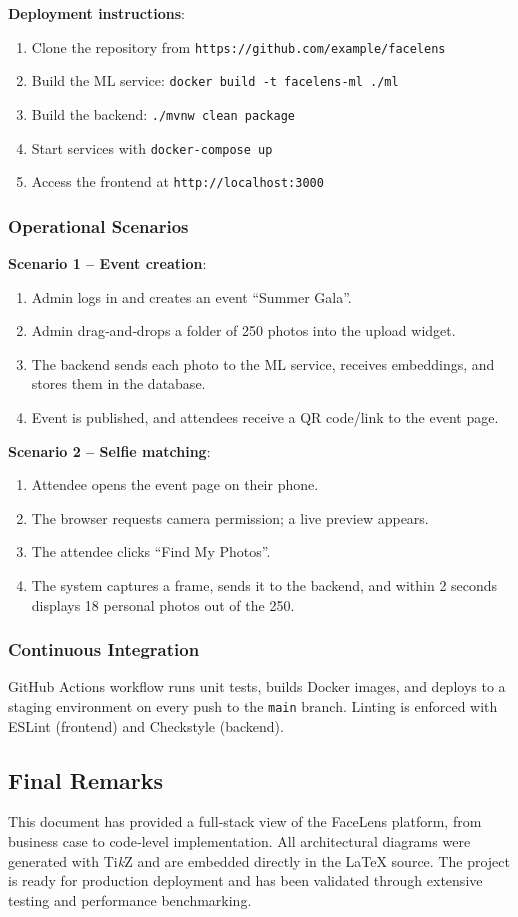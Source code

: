 \documentclass[12pt,a4paper]{article}
\begin{document}
\textbf{Deployment instructions}:
\begin{enumerate}
    \item Clone the repository from \texttt{https://github.com/example/facelens}
    \item Build the ML service: \texttt{docker build -t facelens-ml ./ml}
    \item Build the backend: \texttt{./mvnw clean package}
    \item Start services with \texttt{docker-compose up}
    \item Access the frontend at \texttt{http://localhost:3000}
\end{enumerate}

\subsubsection{Operational Scenarios}
\textbf{Scenario 1 – Event creation}:
\begin{enumerate}
    \item Admin logs in and creates an event “Summer Gala”.
    \item Admin drag‑and‑drops a folder of 250 photos into the upload widget.
    \item The backend sends each photo to the ML service, receives embeddings, and stores them in the database.
    \item Event is published, and attendees receive a QR code/link to the event page.
\end{enumerate}
\textbf{Scenario 2 – Selfie matching}:
\begin{enumerate}
    \item Attendee opens the event page on their phone.
    \item The browser requests camera permission; a live preview appears.
    \item The attendee clicks “Find My Photos”.
    \item The system captures a frame, sends it to the backend, and within 2 seconds displays 18 personal photos out of the 250.
\end{enumerate}

\subsubsection{Continuous Integration}
GitHub Actions workflow runs unit tests, builds Docker images, and deploys to a staging environment on every push to the \texttt{main} branch. Linting is enforced with ESLint (frontend) and Checkstyle (backend).

\subsection{Final Remarks}
This document has provided a full‑stack view of the FaceLens platform, from business case to code‑level implementation. All architectural diagrams were generated with Ti\textit{k}Z and are embedded directly in the \LaTeX{} source. The project is ready for production deployment and has been validated through extensive testing and performance benchmarking.
\end{document}
